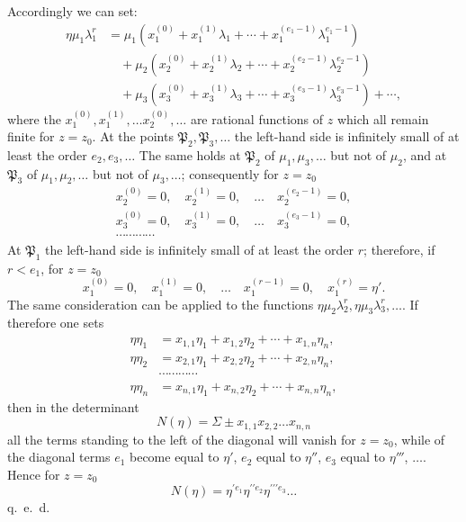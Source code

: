 \documentclass{article}
\begin{document}
Accordingly we can set:
\[ \begin{aligned} \eta\mu_{1}\lambda_{1}^{r} &= \mu_{1}(x_{1}^{(0)} + x_{1}^{(1)}\lambda_{1} + \cdots + x_{1}^{(e_{1}-1)}\lambda_{1}^{e_{1}-1}) \\ &\quad + \mu_{2}(x_{2}^{(0)} + x_{2}^{(1)}\lambda_{2} + \cdots + x_{2}^{(e_{2}-1)}\lambda_{2}^{e_{2}-1}) \\ &\quad + \mu_{3}(x_{3}^{(0)} + x_{3}^{(1)}\lambda_{3} + \cdots + x_{3}^{(e_{3}-1)}\lambda_{3}^{e_{3}-1}) + \cdots, \end{aligned} \]
where the $x_{1}^{(0)}, x_{1}^{(1)}, \ldots x_{2}^{(0)}, \ldots$ are rational functions of $z$ which all remain finite for $z = z_{0}$. At the points $\mathfrak{P}_{2}, \mathfrak{P}_{3}, \ldots$ the left-hand side is infinitely small of at least the order $e_{2}, e_{3}, \ldots$ The same holds at $\mathfrak{P}_{2}$ of $\mu_{1}, \mu_{3}, \ldots$ but not of $\mu_{2}$, and at $\mathfrak{P}_{3}$ of $\mu_{1}, \mu_{2}, \ldots$ but not of $\mu_{3}, \ldots$; consequently for $z = z_{0}$
\[ \begin{gathered} x_{2}^{(0)} = 0, \quad x_{2}^{(1)} = 0, \quad \ldots \quad x_{2}^{(e_{2}-1)} = 0, \\ x_{3}^{(0)} = 0, \quad x_{3}^{(1)} = 0, \quad \ldots \quad x_{3}^{(e_{3}-1)} = 0, \\ \cdots\cdots\cdots\cdots \end{gathered} \]
At $\mathfrak{P}_{1}$ the left-hand side is infinitely small of at least the order $r$; therefore, if $r < e_{1}$, for $z = z_{0}$
\[ x_{1}^{(0)} = 0, \quad x_{1}^{(1)} = 0, \quad \ldots \quad x_{1}^{(r-1)} = 0, \quad x_{1}^{(r)} = \eta'. \]
The same consideration can be applied to the functions $\eta\mu_{2}\lambda_{2}^{r}, \eta\mu_{3}\lambda_{3}^{r}, \ldots$. If therefore one sets
\[ \begin{aligned} \eta\eta_{1} &= x_{1,1}\eta_{1} + x_{1,2}\eta_{2} + \cdots + x_{1,n}\eta_{n}, \\ \eta\eta_{2} &= x_{2,1}\eta_{1} + x_{2,2}\eta_{2} + \cdots + x_{2,n}\eta_{n}, \\ &\cdots\cdots\cdots\cdots \\ \eta\eta_{n} &= x_{n,1}\eta_{1} + x_{n,2}\eta_{2} + \cdots + x_{n,n}\eta_{n}, \end{aligned} \]
then in the determinant
\[ N(\eta) = \Sigma \pm x_{1,1}x_{2,2}\ldots x_{n,n} \]
all the terms standing to the left of the diagonal will vanish for $z = z_{0}$, while of the diagonal terms $e_{1}$ become equal to $\eta'$, $e_{2}$ equal to $\eta''$, $e_{3}$ equal to $\eta'''$, $\ldots$. Hence for $z = z_{0}$
\[ N(\eta) = \eta^{\prime e_{1}}\eta^{\prime\prime e_{2}}\eta^{\prime\prime\prime e_{3}}\ldots \]
q.\ e.\ d.
\end{document}
